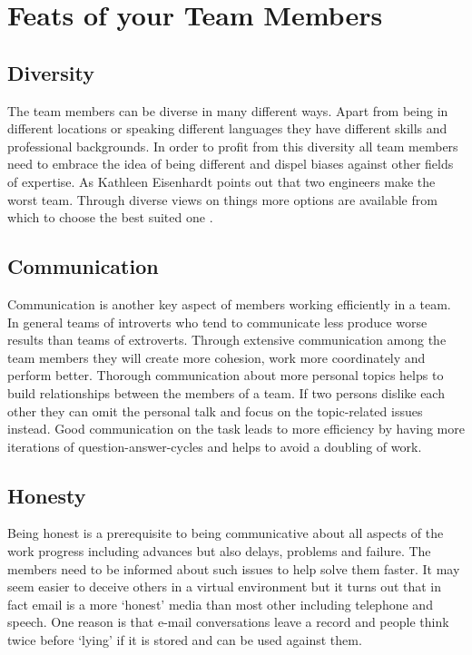 \section{Feats of your Team Members}
\begin{multicols}{2}
\subsection{Diversity} The team members can be diverse in many different ways. Apart from being in different locations or speaking different languages they have different skills and professional backgrounds. In order to profit from this diversity all team members need to embrace the idea of being different and dispel biases against other fields of expertise. As Kathleen Eisenhardt points out that two engineers make the worst team. Through diverse views on things more options are available from which to choose the best suited one \cite{eisenhardt}.

\subsection{Communication}
Communication is another key aspect of members working efficiently in a team. In general teams of introverts who tend to communicate less produce worse results than teams of extroverts. Through extensive communication among the team members they will create more cohesion, work more coordinately and perform better. Thorough communication about more personal topics helps to build relationships between the members of a team. If two persons dislike each other they can omit the personal talk and focus on the topic-related issues instead. Good communication on the task leads to more efficiency by having more iterations of question-answer-cycles and helps to avoid a doubling of work\cite{belbin1996management}.

\subsection{Honesty}
Being honest is a prerequisite to being communicative about all aspects of the work progress including advances but also delays, problems and failure. The members need to be informed about such issues to help solve them faster. It may seem easier to deceive others in a virtual environment but it turns out that in fact email is a more ‘honest’ media than most other including telephone and speech. One reason is that e-mail conversations leave a record and people think twice before ‘lying’ if it is stored and can be used against them\cite{TED}.


\end{multicols}
